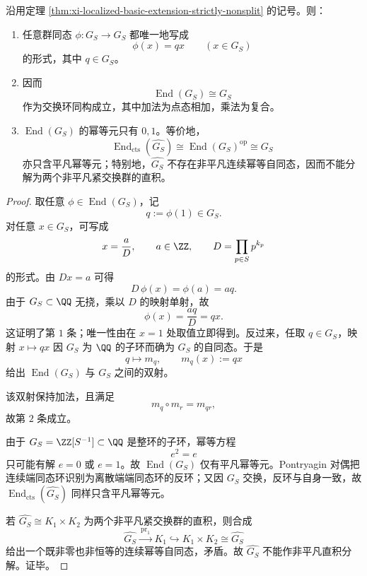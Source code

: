 \begin{theorem}\label{thm:xi-localized-endomorphism-ring-solenoid-indecomposable}
沿用定理 \ref{thm:xi-localized-basic-extension-strictly-nonsplit} 的记号。则：
\begin{enumerate}
  \item 任意群同态 \(\phi:G_S\to G_S\) 都唯一地写成
  \[
  \phi(x)=qx
  \qquad (x\in G_S)
  \]
  的形式，其中 \(q\in G_S\)。
  \item 因而
  \[
  \operatorname{End}(G_S)\cong G_S
  \]
  作为交换环同构成立，其中加法为点态相加，乘法为复合。
  \item \(\operatorname{End}(G_S)\) 的幂等元只有 \(0,1\)。等价地，
  \[
  \operatorname{End}_{\mathrm{cts}}(\widehat{G_S})
  \cong
  \operatorname{End}(G_S)^{\mathrm{op}}
  \cong
  G_S
  \]
  亦只含平凡幂等元；特别地，\(\widehat{G_S}\) 不存在非平凡连续幂等自同态，因而不能分解为两个非平凡紧交换群的直积。
\end{enumerate}
\end{theorem}
\begin{proof}
取任意 \(\phi\in \operatorname{End}(G_S)\)，记
\[
q:=\phi(1)\in G_S.
\]
对任意 \(x\in G_S\)，可写成
\[
x=\frac{a}{D},
\qquad
a\in \ZZ,
\qquad
D=\prod_{p\in S}p^{k_p}
\]
的形式。由 \(Dx=a\) 可得
\[
D\,\phi(x)=\phi(a)=aq.
\]
由于 \(G_S\subset \QQ\) 无挠，乘以 \(D\) 的映射单射，故
\[
\phi(x)=\frac{aq}{D}=qx.
\]
这证明了第 \(1\) 条；唯一性由在 \(x=1\) 处取值立即得到。反过来，任取 \(q\in G_S\)，映射 \(x\mapsto qx\) 因 \(G_S\) 为 \(\QQ\) 的子环而确为 \(G_S\) 的自同态。于是
\[
q\longmapsto m_q,\qquad m_q(x):=qx
\]
给出 \(\operatorname{End}(G_S)\) 与 \(G_S\) 之间的双射。

该双射保持加法，且满足
\[
m_q\circ m_r=m_{qr},
\]
故第 \(2\) 条成立。

由于 \(G_S=\ZZ[S^{-1}]\subset \QQ\) 是整环的子环，幂等方程
\[
e^2=e
\]
只可能有解 \(e=0\) 或 \(e=1\)。故 \(\operatorname{End}(G_S)\) 仅有平凡幂等元。Pontryagin 对偶把连续端同态环识别为离散端端同态环的反环；又因 \(G_S\) 交换，反环与自身一致，故 \(\operatorname{End}_{\mathrm{cts}}(\widehat{G_S})\) 同样只含平凡幂等元。

若 \(\widehat{G_S}\cong K_1\times K_2\) 为两个非平凡紧交换群的直积，则合成
\[
\widehat{G_S}\xrightarrow{\ \mathrm{pr}_1\ }K_1
\hookrightarrow
K_1\times K_2\cong \widehat{G_S}
\]
给出一个既非零也非恒等的连续幂等自同态，矛盾。故 \(\widehat{G_S}\) 不能作非平凡直积分解。证毕。
\end{proof}

